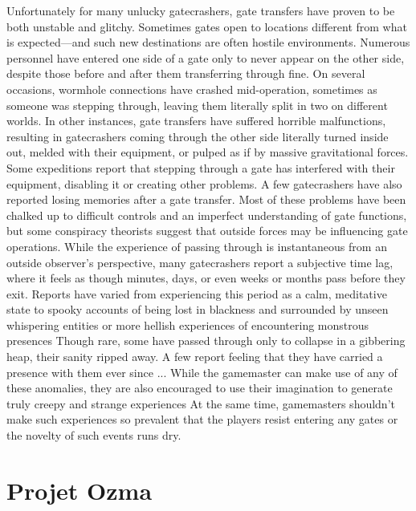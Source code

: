 Unfortunately for many unlucky gatecrashers, gate transfers have proven to be both unstable and glitchy. Sometimes gates open to locations different from what is expected—and such new destinations are often hostile environments. Numerous personnel have entered one side of a gate only to never appear on the other side, despite those before and after them transferring through fine. On several occasions, wormhole connections have crashed mid-operation, sometimes as someone was stepping through, leaving them literally split in two on different worlds. In other instances, gate transfers have suffered horrible malfunctions, resulting in gatecrashers coming through the other side literally turned inside out, melded with their equipment, or pulped as if by massive gravitational forces. Some expeditions report that stepping through a gate has interfered with their equipment, disabling it or creating other problems. A few gatecrashers have also reported losing memories after a gate transfer. Most of these problems have been chalked up to difficult controls and an imperfect understanding of gate functions, but some conspiracy theorists suggest that outside forces may be influencing gate operations. While the experience of passing through is instantaneous from an outside observer's perspective, many gatecrashers report a subjective time lag, where it feels as though minutes, days, or even weeks or months pass before they exit. Reports have varied from experiencing this period as a calm, meditative state to spooky accounts of being lost in blackness and surrounded by unseen whispering entities or more hellish experiences of encountering monstrous presences Though rare, some have passed through only to collapse in a gibbering heap, their sanity ripped away. A few report feeling that they have carried a presence with them ever since ... While the gamemaster can make use of any of these anomalies, they are also encouraged to use their imagination to generate truly creepy and strange experiences At the same time, gamemasters shouldn't make such experiences so prevalent that the players resist entering any gates or the novelty of such events runs dry. 

\section{Projet Ozma} 

